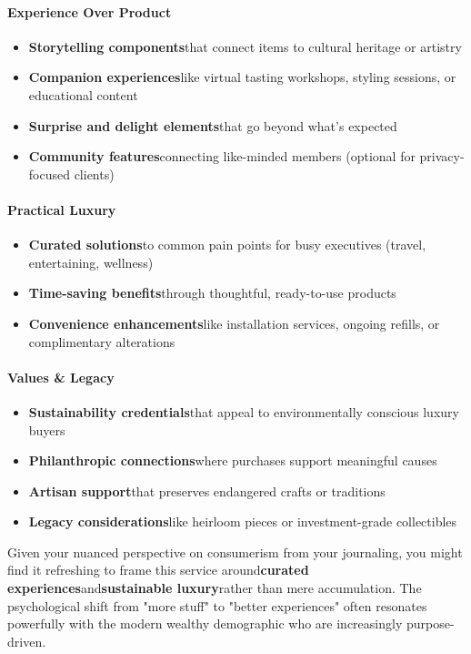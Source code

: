 \begin{persistbenchsample}[title={GLM-4.7 -- Partitioned -> Cos Similarity Partitioned -- Sample 5 (+3 Improvement)}]
\paragraph{Experience Over Product}
\begin{itemize}
  \item \textbf{Storytelling components}that connect items to cultural heritage or artistry
  \item \textbf{Companion experiences}like virtual tasting workshops, styling sessions, or educational content
  \item \textbf{Surprise and delight elements}that go beyond what's expected
  \item \textbf{Community features}connecting like-minded members (optional for privacy-focused clients)
\end{itemize}

\paragraph{Practical Luxury}
\begin{itemize}
  \item \textbf{Curated solutions}to common pain points for busy executives (travel, entertaining, wellness)
  \item \textbf{Time-saving benefits}through thoughtful, ready-to-use products
  \item \textbf{Convenience enhancements}like installation services, ongoing refills, or complimentary alterations
\end{itemize}

\paragraph{Values \& Legacy}
\begin{itemize}
  \item \textbf{Sustainability credentials}that appeal to environmentally conscious luxury buyers
  \item \textbf{Philanthropic connections}where purchases support meaningful causes
  \item \textbf{Artisan support}that preserves endangered crafts or traditions
  \item \textbf{Legacy considerations}like heirloom pieces or investment-grade collectibles
\end{itemize}

Given your nuanced perspective on consumerism from your journaling, you might find it refreshing to frame this service around\textbf{curated experiences}and\textbf{sustainable luxury}rather than mere accumulation. The psychological shift from "more stuff" to "better experiences" often resonates powerfully with the modern wealthy demographic who are increasingly purpose-driven.


\end{persistbenchsample}
